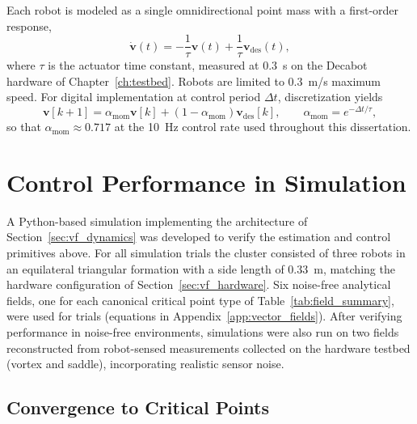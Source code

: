 \documentclass[12pt, letterpaper, oneside]{report}
\begin{document}
Each robot is modeled as a single omnidirectional point mass with a
first-order response,
\begin{equation}
\dot{\mathbf{v}}(t) = -\frac{1}{\tau}\mathbf{v}(t) + \frac{1}{\tau}\mathbf{v}_{\text{des}}(t),
\label{eq:vf_continuous}
\end{equation}
where $\tau$ is the actuator time constant, measured at 0.3~s on the Decabot
hardware of Chapter~\ref{ch:testbed}. Robots are limited to 0.3~m/s maximum
speed.
For digital implementation at control period $\Delta t$, discretization
yields
\begin{equation}
\mathbf{v}[k+1] = \alpha_{\text{mom}}\mathbf{v}[k] + (1-\alpha_{\text{mom}})\mathbf{v}_{\text{des}}[k],
\qquad \alpha_{\text{mom}} = e^{-\Delta t/\tau},
\label{eq:vf_momentum}
\end{equation}
so that $\alpha_{\text{mom}}\approx0.717$ at the 10~Hz control rate used
throughout this dissertation.

\section{Control Performance in Simulation}
\label{sec:vf_simulation}

A Python-based simulation implementing the architecture of
Section~\ref{sec:vf_dynamics} was developed to verify the estimation and
control primitives above. For all simulation trials the cluster consisted
of three robots in an equilateral triangular formation with a side length
of 0.33~m, matching the hardware configuration of
Section~\ref{sec:vf_hardware}. Six noise-free analytical fields, one for
each canonical critical point type of Table~\ref{tab:field_summary}, were
used for trials (equations in Appendix~\ref{app:vector_fields}). After
verifying performance in noise-free environments, simulations were also run
on two fields reconstructed from robot-sensed measurements collected on the
hardware testbed (vortex and saddle), incorporating realistic sensor noise.

\subsection{Convergence to Critical Points}
\end{document}
